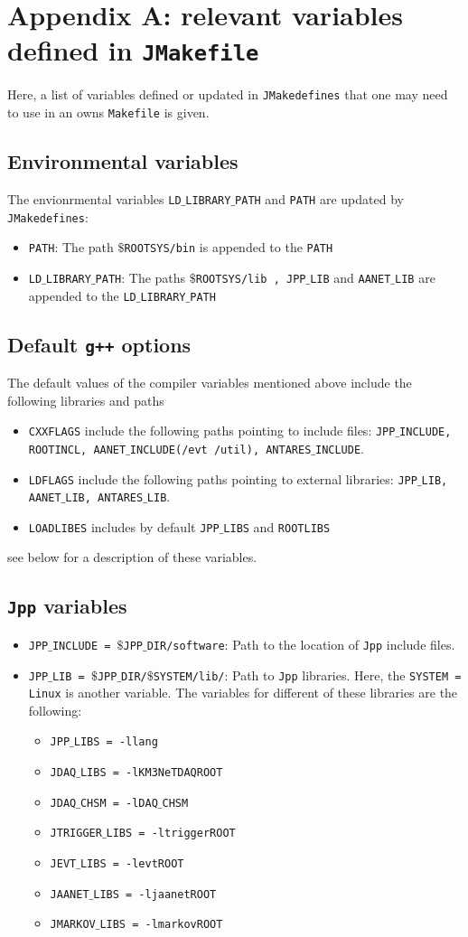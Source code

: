 \documentclass[t]{article}
\begin{document}
\section*{Appendix A: relevant variables defined in {\tt JMakefile}}
Here, a list of variables defined or updated in {\tt JMakedefines} that one may need to use in an owns {\tt Makefile} is given. 
\subsection*{Environmental variables}
The envionrmental variables {\tt LD$\_$LIBRARY$\_$PATH} and {\tt PATH} are updated by {\tt JMakedefines}:
\begin{itemize}
\item {\tt PATH}: The path {\tt $\$$ROOTSYS/bin} is appended to the {\tt PATH}
\item {\tt LD$\_$LIBRARY$\_$PATH}: The paths {\tt $\$$ROOTSYS/lib , JPP$\_$LIB} and {\tt AANET$\_$LIB} are appended to the {\tt LD$\_$LIBRARY$\_$PATH} 
\end{itemize}
\subsection*{Default {\tt g++} options}
The default values of the compiler variables mentioned above include the following libraries and paths
\begin{itemize}
\item {\tt CXXFLAGS} include the following paths pointing to include files: {\tt JPP$\_$INCLUDE, ROOTINCL, AANET$\_$INCLUDE(/evt /util), ANTARES$\_$INCLUDE}.
\item {\tt LDFLAGS} include the following paths pointing to external libraries: {\tt JPP$\_$LIB, AANET$\_$LIB, ANTARES$\_$LIB}.
\item {\tt LOADLIBES} includes by default {\tt JPP$\_$LIBS} and {\tt ROOTLIBS}
\end{itemize} 
see below for a description of these variables. 
\subsection*{{\tt Jpp} variables}
\begin{itemize}
\item {\tt JPP$\_$INCLUDE = $\$$JPP$\_$DIR/software}: Path to the location of {\tt Jpp} include files. 
\item {\tt JPP$\_$LIB = $\$$JPP$\_$DIR/$\$$SYSTEM/lib/}: Path to {\tt Jpp} libraries. Here, the {\tt SYSTEM = Linux} is another variable. The variables for different of these libraries are the following:
\begin{itemize}
\item {\tt JPP$\_$LIBS = -llang}
\item {\tt JDAQ$\_$LIBS = -lKM3NeTDAQROOT}
\item {\tt JDAQ$\_$CHSM = -lDAQ$\_$CHSM}
\item {\tt JTRIGGER$\_$LIBS = -ltriggerROOT}
\item {\tt JEVT$\_$LIBS = -levtROOT}
\item {\tt JAANET$\_$LIBS = -ljaanetROOT}
\item {\tt JMARKOV$\_$LIBS = -lmarkovROOT}
\end{itemize}
\end{itemize}
\end{document}
